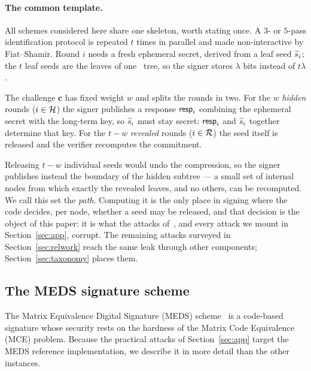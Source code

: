 \paragraph{The common template.}
\label{sec:template}

All schemes considered here share one skeleton, worth stating once. A $3$- or
$5$-pass identification protocol is repeated $t$ times in parallel and made
non-interactive by Fiat--Shamir. Round $i$ needs a fresh ephemeral secret,
derived from a leaf seed $\widetilde{s}_i$; the $t$ leaf seeds are the leaves of one
\GGM\ tree, so the signer stores $\lambda$ bits instead of $t\lambda$.

The challenge $\mathbf{c}$ has fixed weight $w$ and splits the rounds in two.
For the $w$ \emph{hidden} rounds ($i \in \mathcal{H}$) the signer publishes a
response $\mathsf{resp}_i$ combining the ephemeral secret with the long-term key, so
$\widetilde{s}_i$ must stay secret: $\mathsf{resp}_i$ and $\widetilde{s}_i$ together determine that
key. For the $t-w$ \emph{revealed} rounds ($i \in \mathcal{R}$) the seed itself is
released and the verifier recomputes the commitment.

Releasing $t-w$ individual seeds would undo the compression, so the signer
publishes instead the boundary of the hidden subtree --- a small set of
internal nodes from which exactly the revealed leaves, and no others, can be
recomputed. We call this set the \emph{path}. Computing it is the only place
in signing where the code decides, per node, whether a seed may be released,
and that decision is the object of this paper: it is what the attacks
of~\cite{ZKFault,FaultToForge2025}, and every attack we mount in
Section~\ref{sec:app}, corrupt. The remaining attacks surveyed in
Section~\ref{sec:relwork} reach the same leak through other components;
Section~\ref{sec:taxonomy} places them.

\subsection{The MEDS signature scheme}
\label{sec:meds}

The Matrix Equivalence Digital Signature (MEDS) scheme~\cite{ChouNPRRST23} is
a code-based signature whose security rests on the hardness of the Matrix Code
Equivalence (MCE) problem. Because the practical attacks of
Section~\ref{sec:app} target the MEDS reference implementation, we describe it
in more detail than the other instances.


